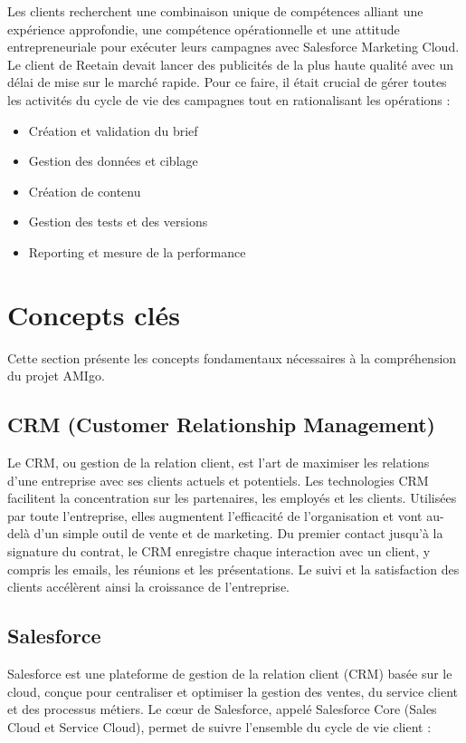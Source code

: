 Les clients recherchent une combinaison unique de compétences alliant une expérience approfondie, une compétence opérationnelle et une attitude entrepreneuriale pour exécuter leurs campagnes avec Salesforce Marketing Cloud. Le client de Reetain devait lancer des publicités de la plus haute qualité avec un délai de mise sur le marché rapide. Pour ce faire, il était crucial de gérer toutes les activités du cycle de vie des campagnes tout en rationalisant les opérations :

\begin{itemize}
    \item[A.] Création et validation du brief
    \item[B.] Gestion des données et ciblage
    \item[C.] Création de contenu
    \item[D.] Gestion des tests et des versions
    \item[E.] Reporting et mesure de la performance
\end{itemize}
\newpage
\section{Concepts clés}


Cette section présente les concepts fondamentaux nécessaires à la compréhension du projet AMIgo.

\subsection{CRM (Customer Relationship Management)}

Le CRM, ou gestion de la relation client, est l'art de maximiser les relations d'une entreprise avec ses clients actuels et potentiels. Les technologies CRM facilitent la concentration sur les partenaires, les employés et les clients. Utilisées par toute l'entreprise, elles augmentent l'efficacité de l'organisation et vont au-delà d'un simple outil de vente et de marketing. Du premier contact jusqu'à la signature du contrat, le CRM enregistre chaque interaction avec un client, y compris les emails, les réunions et les présentations. Le suivi et la satisfaction des clients accélèrent ainsi la croissance de l'entreprise.

\subsection{Salesforce}

Salesforce est une plateforme de gestion de la relation client (CRM) basée sur le cloud, conçue pour centraliser et optimiser la gestion des ventes, du service client et des processus métiers. Le cœur de Salesforce, appelé Salesforce Core (Sales Cloud et Service Cloud), permet de suivre l'ensemble du cycle de vie client :

